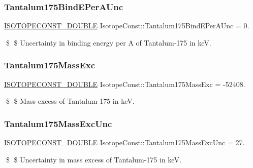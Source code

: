 \subsubsection{\texorpdfstring{Tantalum175\+Bind\+E\+Per\+A\+Unc}{Tantalum175BindEPerAUnc}}
{\footnotesize\ttfamily \mbox{\hyperlink{group___isotope_const-_macros_ga8f45a7272ce02c0b4c65c44636ed719a}{I\+S\+O\+T\+O\+P\+E\+C\+O\+N\+S\+T\+\_\+\+D\+O\+U\+B\+LE}} Isotope\+Const\+::\+Tantalum175\+Bind\+E\+Per\+A\+Unc = 0.}

\$ \$ Uncertainty in binding energy per A of Tantalum-\/175 in keV. \mbox{\label{group___isotope_const-_tantalum-_ta175_ga6d1b96cddcf33c5eee8543a053eccede}} 
\subsubsection{\texorpdfstring{Tantalum175\+Mass\+Exc}{Tantalum175MassExc}}
{\footnotesize\ttfamily \mbox{\hyperlink{group___isotope_const-_macros_ga8f45a7272ce02c0b4c65c44636ed719a}{I\+S\+O\+T\+O\+P\+E\+C\+O\+N\+S\+T\+\_\+\+D\+O\+U\+B\+LE}} Isotope\+Const\+::\+Tantalum175\+Mass\+Exc = -\/52408.}

\$ \$ Mass excess of Tantalum-\/175 in keV. \mbox{\label{group___isotope_const-_tantalum-_ta175_ga70c4abb5ed1f4eb75d2bda5771281343}} 
\subsubsection{\texorpdfstring{Tantalum175\+Mass\+Exc\+Unc}{Tantalum175MassExcUnc}}
{\footnotesize\ttfamily \mbox{\hyperlink{group___isotope_const-_macros_ga8f45a7272ce02c0b4c65c44636ed719a}{I\+S\+O\+T\+O\+P\+E\+C\+O\+N\+S\+T\+\_\+\+D\+O\+U\+B\+LE}} Isotope\+Const\+::\+Tantalum175\+Mass\+Exc\+Unc = 27.}

\$ \$ Uncertainty in mass excess of Tantalum-\/175 in keV. \mbox{\label{group___isotope_const-_tantalum-_ta175_ga8a09813114c4d6b791abe90060b09546}} 
